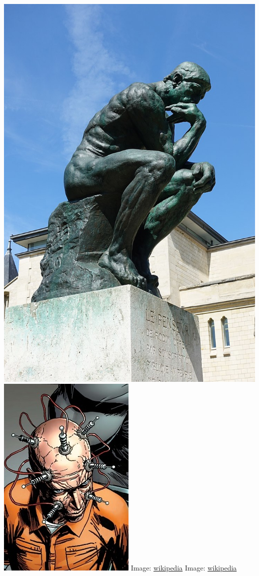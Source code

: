 \documentclass[fleqn]{beamer} %
\begin{document}
\begin{frame}
\begin{multicols}{2}
					\includegraphics[scale=.1]{images/thinker_rodin.png}
					\includegraphics[scale=.25]{images/thinker_dc_comics.png}
					{\tiny Image: \href{https://en.wikipedia.org/wiki/Thinker_(DC_Comics)}{wikipedia}}
					{\tiny Image: \href{https://en.wikipedia.org/wiki/The_Thinker}{wikipedia}}
				\end{multicols}	
				
			\end{frame}
\end{document}
